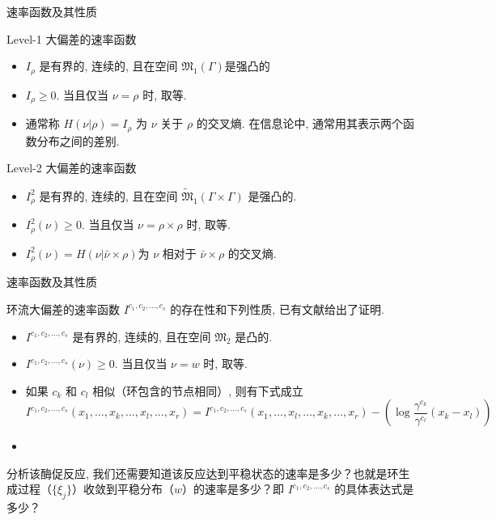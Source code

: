 \documentclass{beamer}
\begin{document}
	\begin{frame}{速率函数及其性质}
		\begin{block}{Level-1 大偏差的速率函数}
			\begin{itemize}
				\item $\mathit{I}_{\rho}$ 是有界的, 连续的, 且在空间 $\mathfrak{M}_1(\Gamma)$是强凸的
				\item $\mathit{I}_{\rho} \ge 0$. 当且仅当 $\nu = \rho$ 时, 取等. 
				\item 通常称 $\mathit{H}(\nu | \rho) = \mathit{I}_{\rho}$ 为 $\nu$ 关于 $\rho$ 的交叉熵. 在信息论中, 通常用其表示两个函数分布之间的差别. 
			\end{itemize}
		\end{block}

		\begin{block}{Level-2 大偏差的速率函数}
			\begin{itemize}
				\item $\mathit{I}^2_{\rho}$ 是有界的, 连续的, 且在空间 $\widetilde{\mathfrak{M}}_1(\Gamma \times \Gamma)$ 是强凸的. 
				\item $\mathit{I}^2_{\rho}(\nu) \ge 0$. 当且仅当 $\nu = \rho \times \rho$ 时, 取等. 
				\item $\mathit{I}_{\rho}^2(\nu) = \mathit{H}(\nu | \bar{\nu} \times \rho)$为 $\nu$ 相对于 $\bar{\nu} \times \rho$ 的交叉熵. 
			\end{itemize}
		\end{block}
	\end{frame}

	\begin{frame}{速率函数及其性质}
		\begin{block}{环流大偏差的速率函数}
			$\mathit{I}^{c_1, c_2, \dots, c_s}$ 的存在性和下列性质, 已有文献给出了证明. 
			\begin{itemize}
				\item $\mathit{I}^{c_1, c_2, \dots, c_s}$ 是有界的, 连续的, 且在空间 $\mathfrak{M}_2$ 是凸的. 
				\item $\mathit{I}^{c_1, c_2, \dots, c_s}(\nu) \ge 0$. 当且仅当 $\nu = w$ 时, 取等. 
				\item 如果 $c_k$ 和 $c_l$ 相似（环包含的节点相同）, 则有下式成立
				$$\mathit{I}^{c_1, c_2, \dots, c_s}(x_1, \dots, x_k, \dots, x_l, \dots, x_r) = \mathit{I}^{c_1, c_2, \dots, c_s}(x_1, \dots, x_l, \dots, x_k, \dots, x_r) - (\log \frac{\gamma^{c_k}}{\gamma^{c_l}} (x_k - x_l))$$
				\item 
			\end{itemize}
		\end{block}
		分析该酶促反应, 我们还需要知道该反应达到平稳状态的速率是多少？也就是环生成过程（$\{\xi_{j}\}$）收敛到平稳分布（$\mathit{w}$）的速率是多少？即 $\mathit{I}^{c_1, c_2, \dots, c_s}$ 的具体表达式是多少？

		
	\end{frame}
\end{document}
